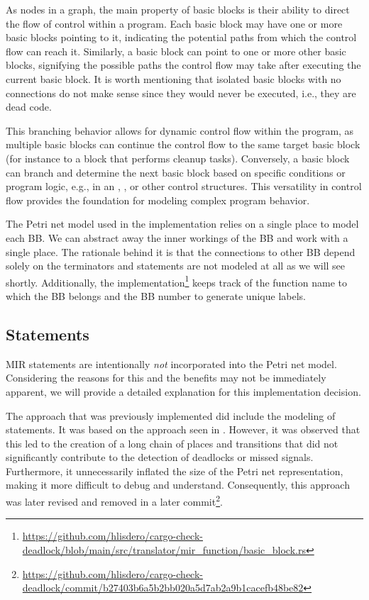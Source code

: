 As nodes in a graph, the main property of basic blocks is
their ability to direct the flow of control within a program.
Each basic block may have one or more basic blocks pointing to it,
indicating the potential paths from which the control flow can reach it.
Similarly, a basic block can point to one or more other basic blocks,
signifying the possible paths the control flow may take after executing the current basic block.
It is worth mentioning that isolated basic blocks with no connections
do not make sense since they would never be executed, i.e., they are dead code.

This branching behavior allows for dynamic control flow within the program,
as multiple basic blocks can continue the control flow to the same target basic block
(for instance to a block that performs cleanup tasks).
Conversely, a basic block can branch and
determine the next basic block based on specific conditions or program logic, e.g.,
in an , ,  or other control structures.
This versatility in control flow provides the foundation for modeling complex program behavior.

The Petri net model used in the implementation relies on a single place to model each \acrshort{BB}.
We can abstract away the inner workings of the \acrshort{BB} and work with a single place.
The rationale behind it is that the connections to other \acrshort{BB} depend solely on the terminators
and statements are not modeled at all as we will see shortly.
Additionally, the implementation\footnote{\url{https://github.com/hlisdero/cargo-check-deadlock/blob/main/src/translator/mir_function/basic_block.rs}}
keeps track of the function name to which the \acrshort{BB} belongs and
the \acrshort{BB} number to generate unique labels.

\subsection{Statements}

\acrshort{MIR} statements are intentionally \emph{not} incorporated into the Petri net model.
Considering the reasons for this and the benefits may not be immediately apparent,
we will provide a detailed explanation for this implementation decision.

The approach that was previously implemented did include the modeling of statements.
It was based on the approach seen in \cite{meyer2020}.
However, it was observed that this led to the creation of a long chain of places and transitions
that did not significantly contribute to the detection of deadlocks or missed signals.
Furthermore, it unnecessarily inflated the size of the Petri net representation,
making it more difficult to debug and understand.
Consequently, this approach was later revised and removed in a later
commit\footnote{\url{https://github.com/hlisdero/cargo-check-deadlock/commit/b27403b6a5b2bb020a5d7ab2a9b1cacefb48be82}}.

